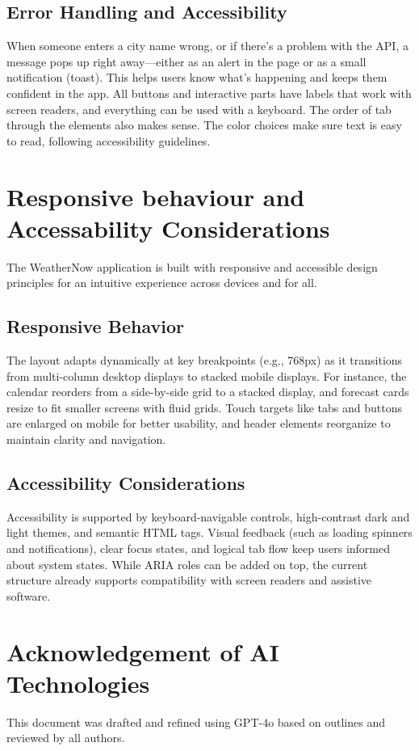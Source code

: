 \documentclass[11pt,a4paper]{article}
\begin{document}
\subsection{Error Handling and Accessibility}
When someone enters a city name wrong, or if there’s a problem with the API, a message pops up right away—either as an alert in the page or as a small notification (toast). This helps users know what’s happening and keeps them confident in the app. All buttons and interactive parts have labels that work with screen readers, and everything can be used with a keyboard. The order of tab through the elements also makes sense. The color choices make sure text is easy to read, following accessibility guidelines.

\section{Responsive behaviour and Accessability Considerations}
The WeatherNow application is built with responsive and accessible design principles for an intuitive experience across devices and for all.

\subsection{Responsive Behavior}
The layout adapts dynamically at key breakpoints (e.g., 768px) as it transitions from multi-column desktop displays to stacked mobile displays. For instance, the calendar reorders from a side-by-side grid to a stacked display, and forecast cards resize to fit smaller screens with fluid grids. Touch targets like tabs and buttons are enlarged on mobile for better usability, and header elements reorganize to maintain clarity and navigation.

\subsection{Accessibility Considerations}
Accessibility is supported by keyboard-navigable controls, high-contrast dark and light themes, and semantic HTML tags. Visual feedback (such as loading spinners and notifications), clear focus states, and logical tab flow keep users informed about system states. While ARIA roles can be added on top, the current structure already supports compatibility with screen readers and assistive software.

\section*{Acknowledgement of AI Technologies}
This document was drafted and refined using GPT-4o based on outlines and reviewed by all authors.
\end{document}
